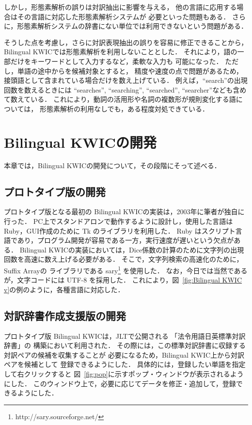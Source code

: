 \documentclass[japanese]{jnlp_1.4}
\begin{document}
しかし，形態素解析の誤りは対訳抽出に影響を与える，
他の言語に応用する場合はその言語に対応した形態素解析システムが
必要といった問題もある．
さらに，形態素解析システムの辞書にない単位では利用できないという問題がある．

そうした点を考慮し，さらに対訳表現抽出の誤りを容易に修正できることから，
Bilingual KWICでは形態素解析を利用しないこととした．
それにより，語の一部だけをキーワードとして入力するなど，柔軟な入力も
可能になった．
ただし，単語の途中からを候補対象とすると，
精度や速度の点で問題があるため，
接頭語として含まれている場合だけを数え上げている．
例えば，``search''の出現回数を数えるときには 
``searches'',
``searching'', ``searched'',
``searcher''なども含めて数えている．
これにより，動詞の活用形や名詞の複数形が規則変化する語については，
形態素解析の利用なしでも，ある程度対処できている．




\section{Bilingual KWICの開発}
\label{sec:history}

本章では，Bilingual KWICの開発について，その段階にそって述べる．


\subsection{プロトタイプ版の開発}

プロトタイプ版となる最初の Bilingual KWICの実装は，2003年に筆者が独自に行った．
PC上でスタンドアロンで動作するように設計し，使用した言語は Ruby，GUI作成のために Tk のライブラリを利用した．
Ruby はスクリプト言語であり，プログラム開発が容易である一方，実行速度が遅いという欠点がある．
Bilingual KWICの実装においては，Dice係数の計算のために文字列の出現回数を高速に数え上げる必要がある．
そこで，文字列検索の高速化のために，Suffix Array\cite{SuffixArray}の
ライブラリである sary\footnote{http://sary.sourceforge.net/}
を使用した．
なお，今日では当然であるが，文字コードには UTF-8 を採用した．
これにより，図~\ref{fig:Bilingual KWIC v}の例のように，各種言語に対応した．


\subsection{対訳辞書作成支援版の開発}

プロトタイプ版 Bilingual KWICは，JLT\cite{Toyama12}で公開される
「法令用語日英標準対訳辞書」の
構築において利用された\cite{Toyama08}．
その際には，この標準対訳辞書に収録する対訳ペアの候補を収集することが
必要になるため，Bilingual KWIC上から対訳ペアを候補として
登録できるようにした．
具体的には，登録したい単語を指定して右クリックすると
図~\ref{fig:pop}に示すポップ・ウィンドウが表示されるようにした．
このウィンドウ上で，必要に応じてデータを修正・追加して，登録できるようにした．
\end{document}
